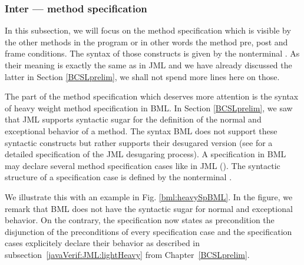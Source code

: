 \subsubsection{Inter --- method specification}

 In this subsection, we will focus on the method specification which is visible by the other methods in the program
 or in other words the method pre, post and frame conditions. 
 The syntax of those constructs is given by the nonterminal
 \MethodSpec. As their meaning is exactly the same as in JML and we have already discussed the latter
  in Section \ref{BCSLprelim}, we shall not spend more lines here on those.

 The part of the method specification which deserves more attention 
 is the syntax of heavy weight method specification in BML. 
 In Section \ref{BCSLprelim}, we saw that JML supports syntactic sugar for
 the definition of the normal and exceptional behavior of a method. 
 The syntax BML does not
 support these syntactic constructs but rather supports their desugared version
 (see \cite{RT03djml} for a detailed specification of the JML desugaring process).
 A specification in BML may declare several method specification cases like in JML (\specCases).
 The syntactic structure of a specification case is defined by the nonterminal \specCase.



 We illustrate this with an example in Fig. \ref{bml:heavySpBML}.
 In the figure, we remark that BML does not have the syntactic sugar for normal and exceptional behavior.
 On the contrary, the specification now states 
as precondition the disjunction of the preconditions of every specification case and 
the specification cases explicitely declare their behavior as described in subsection~\ref{javaVerif:JML:lightHeavy} from Chapter~\ref{BCSLprelim}.

 



